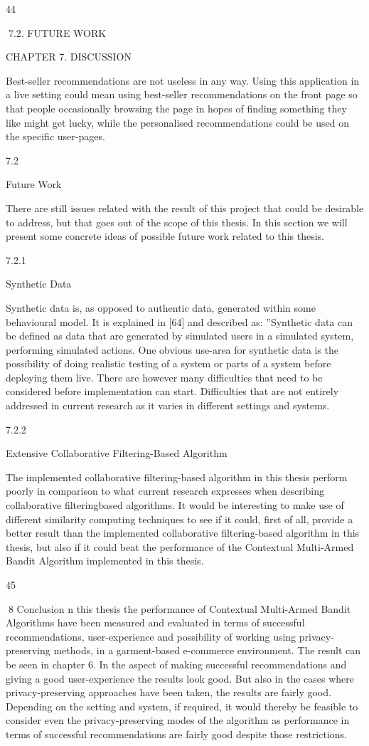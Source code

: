44

7.2. FUTURE WORK

CHAPTER 7. DISCUSSION

Best-seller recommendations are not useless in any way. Using this application in a
live setting could mean using best-seller recommendations on the front page so that
people occasionally browsing the page in hopes of finding something they like might get
lucky, while the personalised recommendations could be used on the specific user-pages.

7.2

Future Work

There are still issues related with the result of this project that could be desirable to
address, but that goes out of the scope of this thesis. In this section we will present
some concrete ideas of possible future work related to this thesis.

7.2.1

Synthetic Data

Synthetic data is, as opposed to authentic data, generated within some behavioural
model. It is explained in [64] and described as: ”Synthetic data can be defined as data
that are generated by simulated users in a simulated system, performing simulated actions.
One obvious use-area for synthetic data is the possibility of doing realistic testing of
a system or parts of a system before deploying them live. There are however many difficulties that need to be considered before implementation can start. Difficulties that are
not entirely addressed in current research as it varies in different settings and systems.

7.2.2

Extensive Collaborative Filtering-Based Algorithm

The implemented collaborative filtering-based algorithm in this thesis perform poorly in
comparison to what current research expresses when describing collaborative filteringbased algorithms. It would be interesting to make use of different similarity computing
techniques to see if it could, first of all, provide a better result than the implemented
collaborative filtering-based algorithm in this thesis, but also if it could beat the performance of the Contextual Multi-Armed Bandit Algorithm implemented in this thesis.

45

8
Conclusion
n this thesis the performance of Contextual Multi-Armed Bandit Algorithms have
been measured and evaluated in terms of successful recommendations, user-experience
and possibility of working using privacy-preserving methods, in a garment-based
e-commerce environment. The result can be seen in chapter 6. In the aspect of making successful recommendations and giving a good user-experience the results look good.
But also in the cases where privacy-preserving approaches have been taken, the results
are fairly good. Depending on the setting and system, if required, it would thereby be
feasible to consider even the privacy-preserving modes of the algorithm as performance
in terms of successful recommendations are fairly good despite those restrictions.

